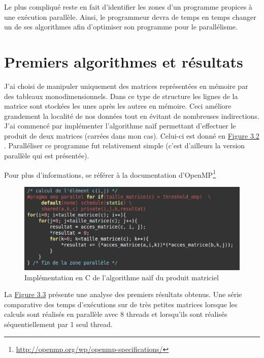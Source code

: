 Le plus compliqué reste en fait d'identifier les zones d'un programme propices à une exécution parallèle. Ainsi, le programmeur devra de temps en temps changer un de ses algorithmes afin d'optimiser son programme pour le parallélisme.  


\section{Premiers algorithmes et résultats}

J'ai choisi de manipuler uniquement des matrices représentées en mémoire par des tableaux monodimensionnels. Dans ce type de structure les lignes de la matrice sont stockées les unes après les autres en mémoire. Ceci améliore grandement la localité de nos données tout en évitant de nombreuses indirections. \\

J'ai commencé par implémenter l'algorithme naïf permettant d'effectuer le produit de deux matrices (carrées dans mon cas). Celui-ci est donné en \hyperref[figure:3.2]{Figure 3.2} . Paralléliser ce programme fut relativement simple (c'est d'ailleurs la version parallèle qui est présentée).

Pour plus d'informations, se référer à la documentation d'OpenMP\footnote{\url{http://openmp.org/wp/openmp-specifications/}}

\begin{figure}[ht]

	\begin{center}
	\includegraphics[scale=0.6]{algo_naif.png} 
	\end{center}
	\caption{Implémentation en C de l'algorithme naïf du produit matriciel}
	\label{figure:3.2}

\end{figure}

La \hyperref[figure:3.3]{Figure 3.3} présente une analyse des premiers résultats obtenus. Une série comparative des temps d'exécutions sur de très petites matrices lorsque les calculs sont réalisés en parallèle avec 8 threads et lorsqu'ils sont réalisés séquentiellement par 1 seul thread. 

